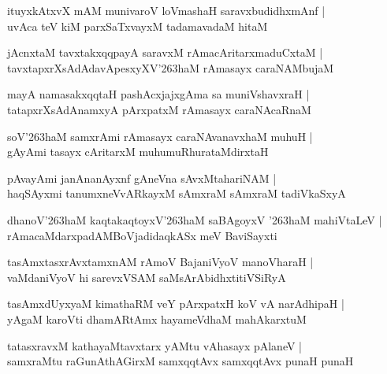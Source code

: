 \documentclass[twoside,12pt,openright]{book}
\def\S{\char'263}
\newcounter{shloka}[chapter]
\begin{document}
\begin{shloka}%
ituyxkAtxvX mAM munivaroV loVmashaH saravxbudidhxmAnf |\\
uvAca teV kiM parxSaTxvayxM tadamavadaM hitaM 
\end{shloka}

\begin{shloka}%
jAcnxtaM tavxtakxqqpayA saravxM rAmacAritarxmaduCxtaM |\\
tavxtapxrXsAdAdavApesxyXV\S haM rAmasayx caraNAMbujaM 
\end{shloka}

\begin{shloka}%
mayA namasakxqqtaH pashAcxjajxgAma sa muniVshavxraH |\\
tatapxrXsAdAnamxyA pArxpatxM rAmasayx caraNAcaRnaM 
\end{shloka}

\begin{shloka}%
soV\S haM samxrAmi rAmasayx caraNAvanavxhaM muhuH |\\
gAyAmi tasayx cAritarxM muhumuRhurataMdirxtaH 
\end{shloka}

\begin{shloka}%
pAvayAmi janAnanAyxnf gAneVna sAvxMtahariNAM |\\
haqSAyxmi tanumxneVvARkayxM sAmxraM sAmxraM tadiVkaSxyA 
\end{shloka}

\begin{shloka}%
dhanoV\S haM kaqtakaqtoyxV\S haM saBAgoyxV \S haM mahiVtaLeV |\\
rAmacaMdarxpadAMBoVjadidaqkASx meV BaviSayxti 
\end{shloka}

\begin{shloka}%
tasAmxtasxrAvxtamxnAM rAmoV BajaniVyoV manoVharaH |\\
vaMdaniVyoV hi sarevxVSAM saMsArAbidhxtitiVSiRyA 
\end{shloka}

\begin{shloka}%
tasAmxdUyxyaM kimathaRM veY pArxpatxH koV vA narAdhipaH |\\
yAgaM karoVti dhamARtAmx hayameVdhaM mahAkarxtuM 
\end{shloka}

\begin{shloka}%
tatasxravxM kathayaMtavxtarx yAMtu vAhasayx pAlaneV |\\
samxraMtu raGunAthAGirxM samxqqtAvx samxqqtAvx punaH punaH 
\end{shloka}
\end{document}
